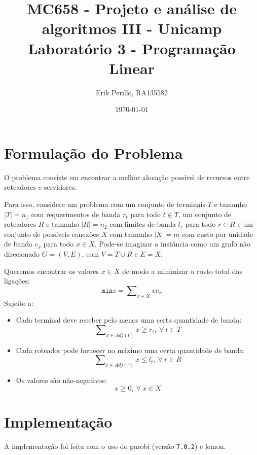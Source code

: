 \documentclass[7pt]{article}
\newcommand{\tbf}[1]{\textbf{#1}}
\newcommand{\ttt}[1]{\texttt{#1}}
\begin{document}
\author{\small Erik Perillo, RA135582}
\date{\small \today}
\title{\vspace{-2cm}%
	{\small MC658 - Projeto e análise de algoritmos III - Unicamp}\\
    {\Large \tbf{Laboratório 3 - Programação Linear}}}
\maketitle\vspace{-0.5cm}

\begin{multicols}{2}

\section{Formulação do Problema}
O problema consiste em encontrar a melhor alocação possível de recursos entre
roteadores e servidores.

Para isso, considere um problema com
um conjunto de terminais $T$ e tamanho $|T| = n_1$
com requerimentos de banda $r_t$ para todo $t \in T$,
um conjunto de roteadores $R$ e tamanho $|R| = n_2$
com limites de banda $l_r$ para todo $r \in R$ e
um conjunto de possíveis conexões $X$ com tamanho $|X| = m$
com custo por unidade de banda $c_x$ para todo $x \in X$.
Pode-se imaginar a instância como um grafo não direcionado
$G = (V, E)$, com $V = T \cup R$ e $E = X$.

Queremos encontrar os valores $x \in X$ de modo a
minimizar o custo total das ligações:
$$\ttt{min} z = \sum\nolimits_{x \in X}xc_x$$
Sujeito a:
\begin{itemize}
    \item Cada terminal deve receber pelo menos uma certa quantidade de banda:
        $$\sum\nolimits_{x \in Adj(t)}x \ge r_t, ~\forall~t \in T$$

    \item Cada roteador pode fornecer no máximo uma certa quantidade de banda:
        $$\sum\nolimits_{x \in Adj(r)}x \le l_t, ~\forall~r \in R$$

    \item Os valores são não-negativos:
        $$x \ge 0, ~\forall~x \in X$$
\end{itemize}

\section{Implementação}
A implementação foi feita com o uso do gurobi (versão \ttt{7.0.2}) e lemon.


\end{multicols}
\end{document}
